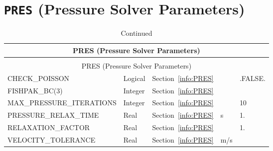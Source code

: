 \documentclass[11pt]{book}
\begin{document}
\vspace{\baselineskip}

\section{\texorpdfstring{{\tt PRES}}{PRES} (Pressure Solver Parameters)}

\begin{longtable}{@{\extracolsep{\fill}}|l|l|l|l|l|}
\caption[Pressure solver parameters ({\ct PRES} namelist group)]{For more information see Section~\ref{info:PRES}.}
\label{tbl:PRES} \\
\hline
\multicolumn{5}{|c|}{{\ct PRES} (Pressure Solver Parameters)} \\
\hline \hline
\endfirsthead
\caption[]{Continued} \\
\hline
\multicolumn{5}{|c|}{{\ct PRES} (Pressure Solver Parameters)} \\
\hline \hline
\endhead
{\ct CHECK\_POISSON}                & Logical       & Section~\ref{info:PRES}           &               & {\ct .FALSE.}             \\ \hline
{\ct FISHPAK\_BC(3)}                & Integer       & Section~\ref{info:PRES}           &               &                           \\ \hline
{\ct MAX\_PRESSURE\_ITERATIONS}     & Integer       & Section~\ref{info:PRES}           &               & 10                        \\ \hline
{\ct PRESSURE\_RELAX\_TIME}         & Real          & Section~\ref{info:PRES}           & s             & 1.                        \\ \hline
{\ct RELAXATION\_FACTOR}            & Real          & Section~\ref{info:PRES}           &               & 1.                        \\ \hline
{\ct VELOCITY\_TOLERANCE}           & Real          & Section~\ref{info:PRES}           & m/s           &                           \\ \hline
\end{longtable}

\end{document}
